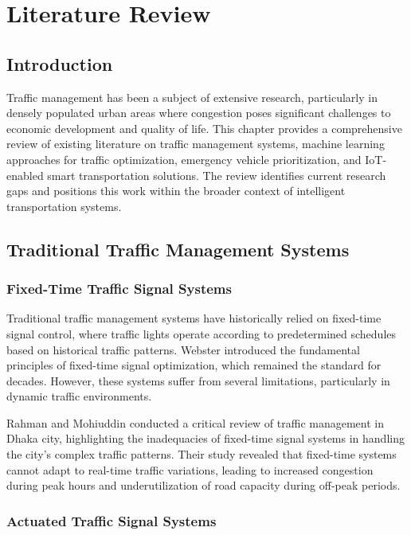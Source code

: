 \chapter{Literature Review}
\label{ch:literature_review}

\section{Introduction}

Traffic management has been a subject of extensive research, particularly in densely populated urban areas where congestion poses significant challenges to economic development and quality of life. This chapter provides a comprehensive review of existing literature on traffic management systems, machine learning approaches for traffic optimization, emergency vehicle prioritization, and IoT-enabled smart transportation solutions. The review identifies current research gaps and positions this work within the broader context of intelligent transportation systems.

\section{Traditional Traffic Management Systems}

\subsection{Fixed-Time Traffic Signal Systems}

Traditional traffic management systems have historically relied on fixed-time signal control, where traffic lights operate according to predetermined schedules based on historical traffic patterns. Webster \cite{webster1958traffic} introduced the fundamental principles of fixed-time signal optimization, which remained the standard for decades. However, these systems suffer from several limitations, particularly in dynamic traffic environments.

Rahman and Mohiuddin \cite{rahman2020traffic} conducted a critical review of traffic management in Dhaka city, highlighting the inadequacies of fixed-time signal systems in handling the city's complex traffic patterns. Their study revealed that fixed-time systems cannot adapt to real-time traffic variations, leading to increased congestion during peak hours and underutilization of road capacity during off-peak periods.

\subsection{Actuated Traffic Signal Systems}

